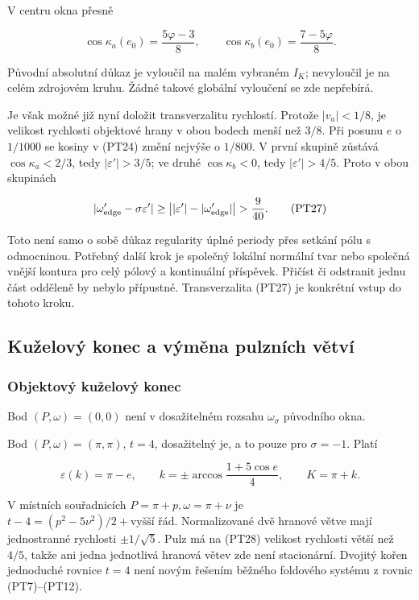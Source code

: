 \documentclass[11pt,a4paper]{article}
\theoremstyle{remark}\newtheorem{remark}[theorem]{Poznámka}
\numberwithin{equation}{section}
\begin{document}
V centru okna přesně

\[
\cos\kappa_a(e_0)=\frac{5\varphi-3}{8},\qquad
\cos\kappa_b(e_0)=\frac{7-5\varphi}{8}.
\tag{PT26}
\]

Původní absolutní důkaz je vyloučil na malém vybraném \(I_K\);
nevyloučil je na celém zdrojovém kruhu. Žádné takové globální
vyloučení se zde nepřebírá.

Je však možné již nyní doložit transverzalitu rychlostí.
Protože \(|v_a|<1/8\), je velikost rychlosti objektové hrany
v obou bodech menší než \(3/8\).
Při posunu \(e\) o \(1/1000\) se kosiny v (PT24) změní nejvýše
o \(1/800\). V první skupině zůstává
\(\cos\kappa_a<2/3\), tedy \(|\varepsilon'|>3/5\);
ve druhé \(\cos\kappa_b<0\), tedy \(|\varepsilon'|>4/5\).
Proto v obou skupinách

\[
|\omega_{\rm edge}'-\sigma\varepsilon'|
\ge\bigl||\varepsilon'|-|\omega_{\rm edge}'|\bigr|
>\frac9{40}.
\tag{PT27}
\]

Toto není samo o sobě důkaz regularity úplné periody přes setkání
pólu s odmocninou. Potřebný další krok je společný lokální normální
tvar nebo společná vnější kontura pro celý pólový a kontinuální
příspěvek. Přičíst či odstranit jednu část odděleně by nebylo
přípustné. Transverzalita (PT27) je konkrétní vstup do tohoto kroku.

\subsection{Kuželový konec a výměna pulzních větví}\label{kuux17eelovuxfd-konec-a-vuxfdmux11bna-pulznuxedch-vux11btvuxed}

\subsubsection{Objektový kuželový konec}\label{objektovuxfd-kuux17eelovuxfd-konec}

Bod \((P,\omega)=(0,0)\) není v dosažitelném rozsahu
\(\omega_\sigma\) původního okna.

Bod \((P,\omega)=(\pi,\pi)\), \(t=4\), dosažitelný je, a to pouze
pro \(\sigma=-1\). Platí

\[
\varepsilon(k)=\pi-e,\qquad
k=\pm\arccos\frac{1+5\cos e}{4},\qquad K=\pi+k.
\tag{PT28}
\]

V místních souřadnicích \(P=\pi+p,\omega=\pi+\nu\) je
\(t-4=(p^2-5\nu^2)/2+\text{vyšší řád}\).
Normalizované dvě hranové větve mají jednostranné rychlosti
\(\pm1/\sqrt5\). Pulz má na (PT28) velikost rychlosti větší než
\(4/5\), takže ani jedna jednotlivá hranová větev zde není
stacionární. Dvojitý kořen jednoduché rovnice \(t=4\) není
novým řešením běžného foldového systému z rovnic (PT7)--(PT12).
\end{document}
